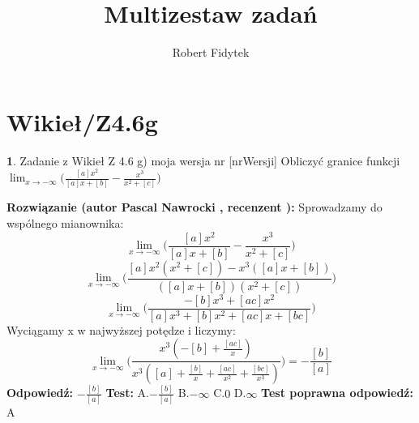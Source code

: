 \documentclass[12pt, a4paper]{article}
\title{Multizestaw zadań}
\author{Robert Fidytek}
\date{}
\theoremstyle{definition} %
\newtheorem{zad}{}
\newcommand{\kategoria}[1]{\section{#1}} %
\newcommand{\zadStart}[1]{\begin{zad}#1\newline} %
\newcommand{\zadStop}{\end{zad}}   %
\newcommand{\rozwStart}[2]{\noindent \textbf{Rozwiązanie (autor #1 , recenzent #2): }\newline} %
\newcommand{\rozwStop}{\newline}                                            %
\newcommand{\odpStart}{\noindent \textbf{Odpowiedź:}\newline}    %
\newcommand{\odpStop}{\newline}                                             %
\newcommand{\testStart}{\noindent \textbf{Test:}\newline} %
\newcommand{\testStop}{\newline} %
\newcommand{\kluczStart}{\noindent \textbf{Test poprawna odpowiedź:}\newline} %
\newcommand{\kluczStop}{\newline} %
\begin{document}
\maketitle


\kategoria{Wikieł/Z4.6g}
\zadStart{Zadanie z Wikieł Z 4.6 g) moja wersja nr [nrWersji]}
Obliczyć granice funkcji $\displaystyle{\lim_{x \to -\infty}}\bigg(\frac{[a]x^2}{[a]x+[b]}-\frac{x^3}{x^2+[c]}\bigg)$
\zadStop
\rozwStart{Pascal Nawrocki}{}
Sprowadzamy do wspólnego mianownika:
$$\displaystyle{\lim_{x \to -\infty}}\bigg(\frac{[a]x^2}{[a]x+[b]}-\frac{x^3}{x^2+[c]}\bigg)$$
$$\displaystyle{\lim_{x \to -\infty}}\bigg(\frac{[a]x^2(x^2+[c])-x^3([a]x+[b])}{([a]x+[b])(x^2+[c])}\bigg)$$
$$\displaystyle{\lim_{x \to -\infty}}\bigg(\frac{-[b]x^3+[ac]x^2}{[a]x^3+[b]x^2+[ac]x+[bc]}\bigg)$$
Wyciągamy x w najwyższej potędze i liczymy:
$$\displaystyle{\lim_{x \to -\infty}}\bigg(\frac{x^3(-[b]+\frac{[ac]}{x})}{x^3([a]+\frac{[b]}{x}+\frac{[ac]}{x^2}+\frac{[bc]}{x^3})}\bigg)=-\frac{[b]}{[a]}$$
\rozwStop
\odpStart
$-\frac{[b]}{[a]}$
\odpStop
\testStart
A.$-\frac{[b]}{[a]}$
B.$-\infty$
C.$0$
D.$\infty$
\testStop
\kluczStart
A
\kluczStop
\end{document}
